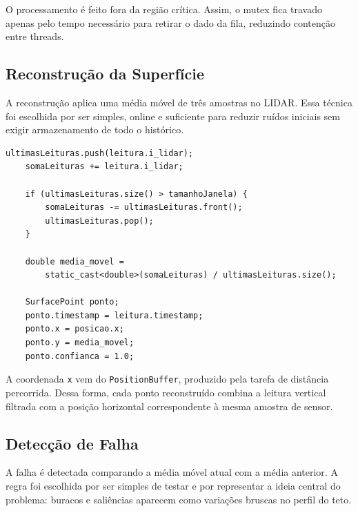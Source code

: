 \documentclass[12pt,a4paper]{article}
\begin{document}
    O processamento é feito fora da região crítica. Assim, o mutex fica travado apenas pelo tempo necessário para retirar o dado da fila, reduzindo contenção entre threads.

    \subsection{Reconstrução da Superfície}

    A reconstrução aplica uma média móvel de três amostras no LIDAR. Essa técnica foi escolhida por ser simples, online e suficiente para reduzir ruídos iniciais sem exigir armazenamento de todo o histórico.

    \begin{lstlisting}[style=cppstyle]
    ultimasLeituras.push(leitura.i_lidar);
    somaLeituras += leitura.i_lidar;

    if (ultimasLeituras.size() > tamanhoJanela) {
        somaLeituras -= ultimasLeituras.front();
        ultimasLeituras.pop();
    }

    double media_movel =
        static_cast<double>(somaLeituras) / ultimasLeituras.size();

    SurfacePoint ponto;
    ponto.timestamp = leitura.timestamp;
    ponto.x = posicao.x;
    ponto.y = media_movel;
    ponto.confianca = 1.0;
    \end{lstlisting}

    A coordenada \texttt{x} vem do \texttt{PositionBuffer}, produzido pela tarefa de distância percorrida. Dessa forma, cada ponto reconstruído combina a leitura vertical filtrada com a posição horizontal correspondente à mesma amostra de sensor.

    \subsection{Detecção de Falha}

    A falha é detectada comparando a média móvel atual com a média anterior. A regra foi escolhida por ser simples de testar e por representar a ideia central do problema: buracos e saliências aparecem como variações bruscas no perfil do teto.
\end{document}
